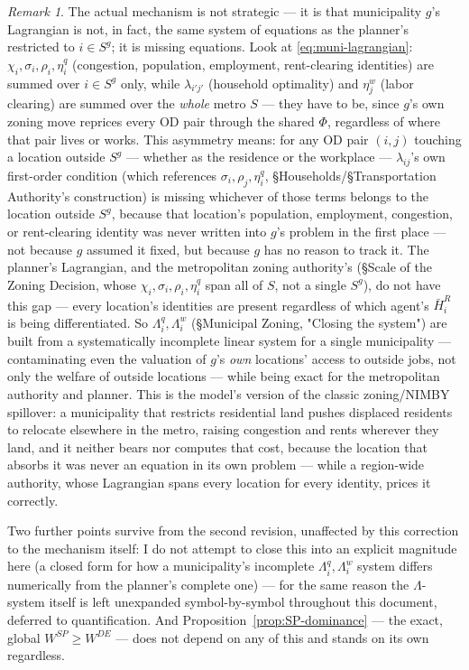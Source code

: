 \documentclass[12pt, a4paper]{article}
\theoremstyle{definition}
\theoremstyle{remark}
\newtheorem*{remark}{Remark}
\begin{document}
\begin{remark}
The actual mechanism is not strategic — it is that municipality $g$'s Lagrangian is not, in fact, the same system of equations as the planner's restricted to $i\in S^g$; it is missing equations. Look at \eqref{eq:muni-lagrangian}: $\chi_i,\sigma_i,\rho_i,\eta_i^q$ (congestion, population, employment, rent-clearing identities) are summed over $i\in S^g$ only, while $\lambda_{i'j'}$ (household optimality) and $\eta_j^w$ (labor clearing) are summed over the \emph{whole} metro $S$ — they have to be, since $g$'s own zoning move reprices every OD pair through the shared $\Phi$, regardless of where that pair lives or works. This asymmetry means: for any OD pair $(i,j)$ touching a location outside $S^g$ — whether as the residence or the workplace — $\lambda_{ij}$'s own first-order condition (which references $\sigma_i,\rho_j,\eta_i^q$, \S Households/\S Transportation Authority's construction) is missing whichever of those terms belongs to the location outside $S^g$, because that location's population, employment, congestion, or rent-clearing identity was never written into $g$'s problem in the first place — not because $g$ assumed it fixed, but because $g$ has no reason to track it. The planner's Lagrangian, and the metropolitan zoning authority's (\S Scale of the Zoning Decision, whose $\chi_i,\sigma_i,\rho_i,\eta_i^q$ span all of $S$, not a single $S^g$), do not have this gap — every location's identities are present regardless of which agent's $\bar H_i^R$ is being differentiated. So $\Lambda_i^q,\Lambda_i^w$ (\S Municipal Zoning, "Closing the system") are built from a systematically incomplete linear system for a single municipality — contaminating even the valuation of $g$'s \emph{own} locations' access to outside jobs, not only the welfare of outside locations — while being exact for the metropolitan authority and planner. This is the model's version of the classic zoning/NIMBY spillover: a municipality that restricts residential land pushes displaced residents to relocate elsewhere in the metro, raising congestion and rents wherever they land, and it neither bears nor computes that cost, because the location that absorbs it was never an equation in its own problem — while a region-wide authority, whose Lagrangian spans every location for every identity, prices it correctly.

Two further points survive from the second revision, unaffected by this correction to the mechanism itself: I do not attempt to close this into an explicit magnitude here (a closed form for how a municipality's incomplete $\Lambda_i^q,\Lambda_i^w$ system differs numerically from the planner's complete one) — for the same reason the $\Lambda$-system itself is left unexpanded symbol-by-symbol throughout this document, deferred to quantification. And Proposition~\ref{prop:SP-dominance} — the exact, global $W^{SP}\geq W^{DE}$ — does not depend on any of this and stands on its own regardless.
\end{remark}


\printbibliography
\end{document}
